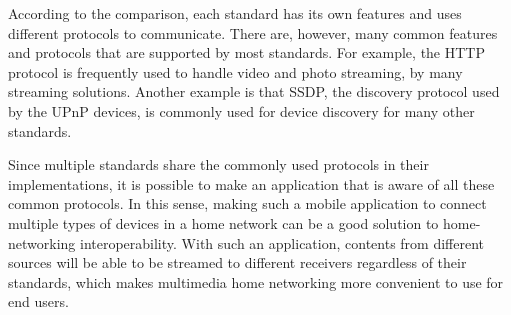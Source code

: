 According to the comparison, each standard has its own features and uses 
different protocols to communicate. There are, however, many common features
and protocols that are supported by most standards. For example, the HTTP
protocol is frequently used to handle video and photo streaming, by many
streaming solutions. Another example is that SSDP, the discovery protocol used
by the UPnP devices, is commonly used for device discovery for many other
standards.

Since multiple standards share the commonly used protocols in their
implementations, it is possible to make an application that is aware of all
these common protocols. In this sense, making such a mobile application to
connect multiple types of devices in a home network can be a good solution to
home-networking interoperability. With such an application, contents from
different sources will be able to be streamed to different receivers regardless
of their standards, which makes multimedia home networking more convenient to
use for end users.